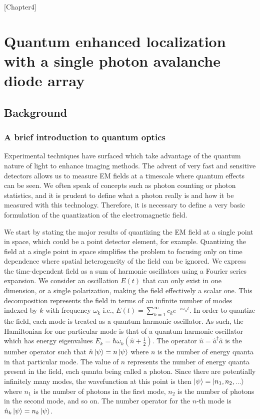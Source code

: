 [Chapter4]

\chapter{Quantum enhanced localization with a single photon avalanche diode array}

\section{Background}

\subsection{A brief introduction to quantum optics}

Experimental techniques have surfaced which take advantage of the quantum nature of light to enhance imaging methods. The advent of very fast and sensitive detectors allows us to measure EM fields at a timescale where quantum effects can be seen. We often speak of concepts such as photon counting or photon statistics, and it is prudent to define what a photon really is and how it be measured with this technology. Therefore, it is necessary to define a very basic formulation of the quantization of the electromagnetic field. 

We start by stating the major results of quantizing the EM field at a single point in space, which could be a point detector element, for example. Quantizing the field at a single point in space simplifies the problem to focusing only on time dependence where spatial heterogeneity of the field can be ignored. We express the time-dependent field as a sum of harmonic oscillators using a Fourier series expansion. We consider an oscillation $E(t)$ that can only exist in one dimension, or a single polarization, making the field effectively a scalar one. This decomposition represents the field in terms of an infinite number of modes indexed by $k$ with frequency $\omega_{k}$ i.e., $E(t) = \sum_{k=1}^\infty c_{k}e^{-i\omega_{n} t}$. In order to quantize the field, each mode is treated as a quantum harmonic oscillator. As such, the Hamiltonian for one particular mode is that of a quantum harmonic oscillator which has energy eigenvalues $E_{k} = \hbar\omega_{k}(\hat{n} + \frac{1}{2})$. The operator $\hat{n}=\hat{a}^{\dagger}\hat{a}$ is the number operator such that $\hat{n}\ket{\psi} = n\ket{\psi}$ where $n$ is the number of energy quanta in that particular mode. The value of $n$ represents the number of energy quanta present in the field, each quanta being called a photon. Since there are potentially infinitely many modes, the wavefunction at this point is then $\ket{\psi} = \ket{n_{1},n_{2},...}$ where $n_1$ is the number of photons in the first mode, $n_2$ is the number of photons in the second mode, and so on. The number operator for the $n$-th mode is $\hat{n}_k\ket{\psi} = n_{k}\ket{\psi}$. 

